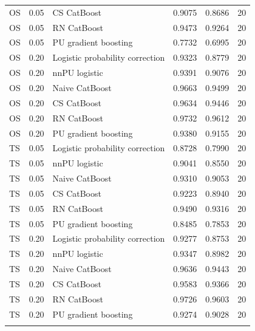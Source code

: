 \begin{longtable}{@{}p{0.65in}rp{2.85in}rrr@{}}
OS & 0.05 & CS CatBoost & 0.9075 & 0.8686 & 20 \\
OS & 0.05 & RN CatBoost & 0.9473 & 0.9264 & 20 \\
OS & 0.05 & PU gradient boosting & 0.7732 & 0.6995 & 20 \\
\addlinespace[2pt]
OS & 0.20 & Logistic probability correction & 0.9323 & 0.8779 & 20 \\
OS & 0.20 & nnPU logistic & 0.9391 & 0.9076 & 20 \\
OS & 0.20 & Naive CatBoost & 0.9663 & 0.9499 & 20 \\
OS & 0.20 & CS CatBoost & 0.9634 & 0.9446 & 20 \\
OS & 0.20 & RN CatBoost & 0.9732 & 0.9612 & 20 \\
OS & 0.20 & PU gradient boosting & 0.9380 & 0.9155 & 20 \\
\addlinespace[2pt]
TS & 0.05 & Logistic probability correction & 0.8728 & 0.7990 & 20 \\
TS & 0.05 & nnPU logistic & 0.9041 & 0.8550 & 20 \\
TS & 0.05 & Naive CatBoost & 0.9310 & 0.9053 & 20 \\
TS & 0.05 & CS CatBoost & 0.9223 & 0.8940 & 20 \\
TS & 0.05 & RN CatBoost & 0.9490 & 0.9316 & 20 \\
TS & 0.05 & PU gradient boosting & 0.8485 & 0.7853 & 20 \\
\addlinespace[2pt]
TS & 0.20 & Logistic probability correction & 0.9277 & 0.8753 & 20 \\
TS & 0.20 & nnPU logistic & 0.9347 & 0.8982 & 20 \\
TS & 0.20 & Naive CatBoost & 0.9636 & 0.9443 & 20 \\
TS & 0.20 & CS CatBoost & 0.9583 & 0.9366 & 20 \\
TS & 0.20 & RN CatBoost & 0.9726 & 0.9603 & 20 \\
TS & 0.20 & PU gradient boosting & 0.9274 & 0.9028 & 20 \\
\addlinespace[2pt]
\end{longtable}
\endgroup
